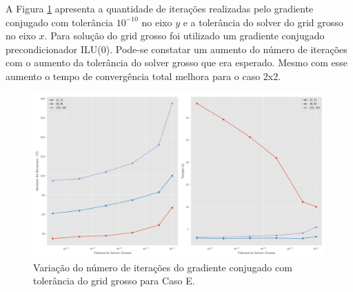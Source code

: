 A Figura \ref{fig:toleranciaGrossa} apresenta a quantidade de iterações realizadas pelo gradiente conjugado com tolerância $10^{-10}$ no eixo $y$ e a tolerância do solver do grid grosso no eixo $x$. Para solução do grid grosso foi utilizado um gradiente conjugado precondicionador ILU(0). Pode-se constatar um aumento do número de iterações com o aumento da tolerância do solver grosso que era esperado. Mesmo com esse aumento o tempo de convergência total melhora para o caso 2x2.



\begin{figure}[!htbp]
\centering
\includegraphics[width=\textwidth]{chap08/figs/Acuracia93MM.png}
\caption{ Variação do número de iterações do gradiente conjugado com tolerância do grid grosso para Caso E.}
\label{fig:toleranciaGrossa}
\end{figure}


